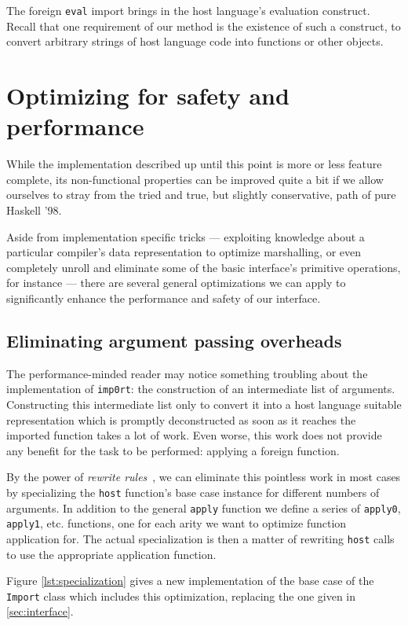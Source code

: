 \documentclass[preprint]{sigplanconf}
\begin{document}
The foreign \lstinline!eval! import brings in the host language's evaluation
construct. Recall that one requirement of our method is the existence of such
a construct, to convert arbitrary strings of host language code into functions
or other objects.

\section{Optimizing for safety and performance}
\label{sec:optimizations}
While the implementation described up until this point is more or less
feature complete, its non-functional properties can be improved quite a bit
if we allow ourselves to stray from the tried and true, but slightly
conservative, path of pure Haskell '98.

Aside from implementation specific tricks --- exploiting knowledge about a
particular compiler's data representation to optimize marshalling, or even
completely unroll and eliminate some of the basic interface's primitive
operations, for instance --- there are several general optimizations we can
apply to significantly enhance the performance and safety of our interface.

\subsection{Eliminating argument passing overheads}
\label{sec:specialization}
The performance-minded reader may notice something troubling about the
implementation of \lstinline!imp0rt!: the construction of an intermediate list
of arguments. Constructing this intermediate list only to convert it into a
host language suitable representation which is promptly deconstructed as soon
as it reaches the imported function takes a lot of work. Even worse, this work
does not provide any benefit for the task to be performed: applying a foreign
function.

By the power of \emph{rewrite rules}\ \cite{rewriterules}, we can
eliminate this pointless work in most cases by specializing the
\lstinline!host! function's base case instance for different numbers of
arguments.
In addition to the general \lstinline!apply! function we define a series of
\lstinline!apply0!, \lstinline!apply1!, etc. functions, one for each arity
we want to optimize function application for.
The actual specialization is then a matter of
rewriting \lstinline!host! calls to use the appropriate application function.

Figure \ref{lst:specialization} gives a new implementation of the base case
of the \lstinline!Import! class which includes this optimization, replacing
the one given in \ref{sec:interface}.
\end{document}

